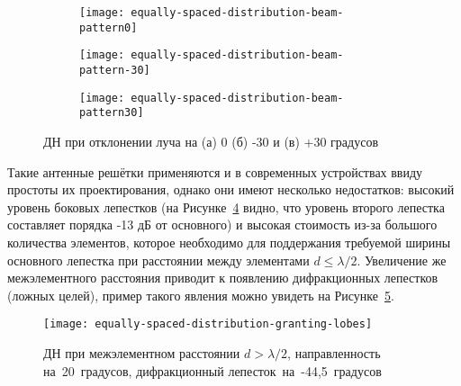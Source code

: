 \begin{figure}[!ht]
    \centering
    \begin{subfigure}[b]{0.55\textwidth}
        \centering
        \hspace*{-3.5ex}
        \texttt{[image: equally-spaced-distribution-beam-pattern0]}
        \caption{}%
        \label{fig:equally-spaced-distribution-beam-pattern0}
    \end{subfigure}
    \hfill
    \begin{subfigure}[b]{0.49\textwidth}
        \centering
        \hspace*{-3ex}
        \texttt{[image: equally-spaced-distribution-beam-pattern-30]}
        \caption{}%
        \label{fig:equally-spaced-distribution-beam-pattern-30}
    \end{subfigure}
    \begin{subfigure}[b]{0.49\textwidth}
        \centering
        \hspace*{-3ex}
        \texttt{[image: equally-spaced-distribution-beam-pattern30]}
        \caption{}%
        \label{fig:equally-spaced-distribution-beam-pattern30}
    \end{subfigure}
    \caption{%
        ДН при отклонении луча на
        (а) 0
        (б) -30 и
        (в) +30 градусов
    }%
    \label{fig:equally-spaced-distribution}
\end{figure}

Такие антенные решётки применяются и в современных устройствах ввиду простоты их проектирования, 
однако они имеют несколько недостатков: высокий уровень боковых лепестков 
(на Рисунке~\ref{fig:equally-spaced-distribution} видно, что уровень второго лепестка составляет порядка -13 дБ от основного) 
и высокая стоимость из-за большого количества элементов, которое необходимо для поддержания требуемой
ширины основного лепестка при расстоянии между элементами $d \leq \lambda/2$. 
Увеличение же межэлементного расстояния приводит к появлению дифракционных 
лепестков (ложных целей), пример такого явления можно увидеть на Рисунке~\ref{fig:equally-spaced-distribution-granting-lobes}.

\begin{figure}[!ht]
    \centering
    \hspace*{-3ex}
    \texttt{[image: equally-spaced-distribution-granting-lobes]}
    \caption{ДН при межэлементном расстоянии $d > \lambda/2$,
        направленность на~20~градусов,
        дифракционный лепесток~на~-44,5~градусов}%
    \label{fig:equally-spaced-distribution-granting-lobes}
\end{figure}


